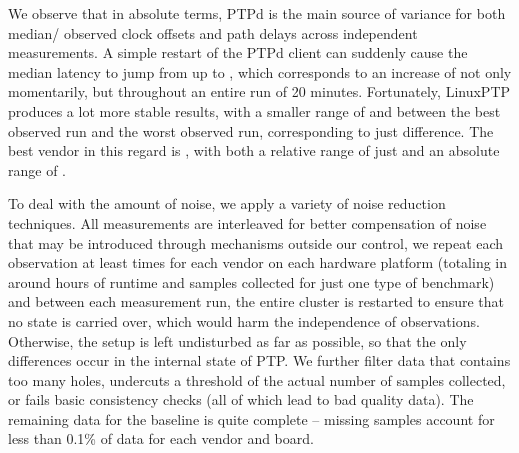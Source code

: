 {

\renewcommand{\ptpKeyPrefix}{/reproducibility/rpi-4}


We observe that in absolute terms, PTPd is the main source of variance for both median/\PNineFive{} observed clock offsets and path delays across independent measurements. A simple restart of the PTPd client can suddenly cause the median latency to jump from  up to , which corresponds to an increase of  not only momentarily, but throughout an entire run of 20 minutes.
Fortunately, LinuxPTP produces a lot more stable results, with a smaller range of  and  between the best observed run and the worst observed run, corresponding to just  difference. The best vendor in this regard is \fVendor{\cmpMinArg}, with both a relative range of just \fRelative{\cmpMin} and an absolute range of .
%
%

To deal with the amount of noise, we apply a variety of noise reduction techniques. All measurements are interleaved for better compensation of noise that may be introduced through mechanisms outside our control, we repeat each observation at least \numBaselineMeasurements{} times for each vendor on each hardware platform (totaling in around  hours of runtime and  samples collected for just one type of benchmark) and between each measurement run, the entire cluster is restarted to ensure that no state is carried over, which would harm the independence of observations. Otherwise, the setup is left undisturbed as far as possible, so that the only differences occur in the internal state of PTP. We further filter data that contains too many holes, undercuts a threshold of the actual number of samples collected, or fails basic consistency checks (all of which lead to bad quality data). The remaining data for the baseline is quite complete -- missing samples account for less than 0.1\% of data for each vendor and board.

}
